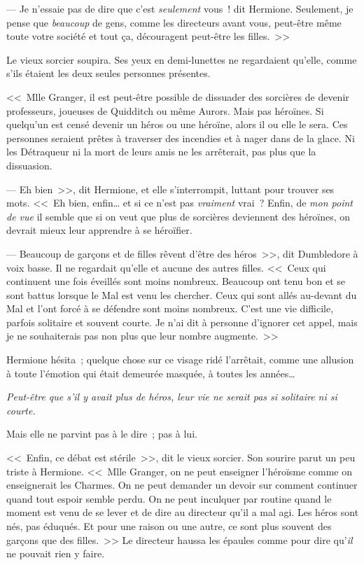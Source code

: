 --- Je n'essaie pas de dire que c'est \emph{seulement} vous~! dit Hermione. Seulement, je pense que \emph{beaucoup} de gens, comme les directeurs avant vous, peut-être même toute votre société et tout ça, découragent peut-être les filles.~>>

Le vieux sorcier soupira. Ses yeux en demi-lunettes ne regardaient qu'elle, comme s'ils étaient les deux seules personnes présentes.

<<~Mlle Granger, il est peut-être possible de dissuader des sorcières de devenir professeurs, joueuses de Quidditch ou même Aurors. Mais pas héroïnes. Si quelqu'un est censé devenir un héros ou une héroïne, alors il ou elle le sera. Ces personnes seraient prêtes à traverser des incendies et à nager dans de la glace. Ni les Détraqueur ni la mort de leurs amis ne les arrêterait, pas plus que la dissuasion.

--- Eh bien~>>, dit Hermione, et elle s'interrompit, luttant pour trouver ses mots. <<~Eh bien, enfin… et si ce n'est pas \emph{vraiment} vrai~? Enfin, de \emph{mon point de vue} il semble que si on veut que plus de sorcières deviennent des héroïnes, on devrait mieux leur apprendre à se héroïfier.

--- Beaucoup de garçons et de filles rêvent d'être des héros~>>, dit Dumbledore à voix basse. Il ne regardait qu'elle et aucune des autres filles. <<~Ceux qui continuent une fois éveillés sont moins nombreux. Beaucoup ont tenu bon et se sont battus lorsque le Mal est venu les chercher. Ceux qui sont allés au-devant du Mal et l'ont forcé à se défendre sont moins nombreux. C'est une vie difficile, parfois solitaire et souvent courte. Je n'ai dit à personne d'ignorer cet appel, mais je ne souhaiterais pas non plus que leur nombre augmente.~>>

Hermione hésita~; quelque chose sur ce visage ridé l'arrêtait, comme une allusion à toute l'émotion qui était demeurée masquée, à toutes les années…

\emph{Peut-être que s'il y avait plus de héros, leur vie ne serait pas si solitaire ni si courte.}

Mais elle ne parvint pas à le dire~; pas à lui.

<<~Enfin, ce débat est stérile~>>, dit le vieux sorcier. Son sourire parut un peu triste à Hermione. <<~Mlle Granger, on ne peut enseigner l'héroïsme comme on enseignerait les Charmes. On ne peut demander un devoir sur comment continuer quand tout espoir semble perdu. On ne peut inculquer par routine quand le moment est venu de se lever et de dire au directeur qu'il a mal agi. Les héros sont nés, pas éduqués. Et pour une raison ou une autre, ce sont plus souvent des garçons que des filles.~>> Le directeur haussa les épaules comme pour dire qu'\emph{il} ne pouvait rien y faire.


